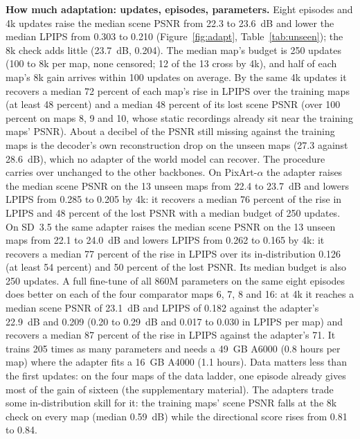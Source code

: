 \documentclass{article}
\newif\ifwithappendix \withappendixfalse %
\newcommand{\appref}[1]{\ifwithappendix Appendix~\ref{#1}\else the supplementary material\fi}
\begin{document}
\textbf{How much adaptation: updates, episodes, parameters.}
Eight episodes and 4k updates raise the median scene PSNR from 22.3 to 23.6~dB and lower the median LPIPS from 0.303 to 0.210 (Figure~\ref{fig:adapt}, Table~\ref{tab:unseen}); the 8k check adds little (23.7~dB, 0.204).
The median map's budget is 250 updates (100 to 8k per map, none censored; 12 of the 13 cross by 4k), and half of each map's 8k gain arrives within 100 updates on average.
By the same 4k updates it recovers a median 72 percent of each map's rise in LPIPS over the training maps (at least 48 percent) and a median 48 percent of its lost scene PSNR (over 100 percent on maps 8, 9 and 10, whose static recordings already sit near the training maps' PSNR).
About a decibel of the PSNR still missing against the training maps is the decoder's own reconstruction drop on the unseen maps (27.3 against 28.6~dB), which no adapter of the world model can recover.
The procedure carries over unchanged to the other backbones.
On PixArt-$\alpha$ the adapter raises the median scene PSNR on the 13 unseen maps from 22.4 to 23.7~dB and lowers LPIPS from 0.285 to 0.205 by 4k: it recovers a median 76 percent of the rise in LPIPS and 48 percent of the lost PSNR with a median budget of 250 updates.
On SD~3.5 the same adapter raises the median scene PSNR on the 13 unseen maps from 22.1 to 24.0~dB and lowers LPIPS from 0.262 to 0.165 by 4k: it recovers a median 77 percent of the rise in LPIPS over its in-distribution 0.126 (at least 54 percent) and 50 percent of the lost PSNR.
Its median budget is also 250 updates.
A full fine-tune of all 860M parameters on the same eight episodes does better on each of the four comparator maps 6, 7, 8 and 16: at 4k it reaches a median scene PSNR of 23.1~dB and LPIPS of 0.182 against the adapter's 22.9~dB and 0.209 (0.20 to 0.29~dB and 0.017 to 0.030 in LPIPS per map) and recovers a median 87 percent of the rise in LPIPS against the adapter's 71. It trains 205 times as many parameters and needs a 49~GB A6000 (0.8 hours per map) where the adapter fits a 16~GB A4000 (1.1 hours).
Data matters less than the first updates: on the four maps of the data ladder, one episode already gives most of the gain of sixteen (\appref{app:perarena-adapt}).
The adapters trade some in-distribution skill for it: the training maps' scene PSNR falls at the 8k check on every map (median 0.59~dB) while the directional score rises from 0.81 to 0.84.


\end{document}
